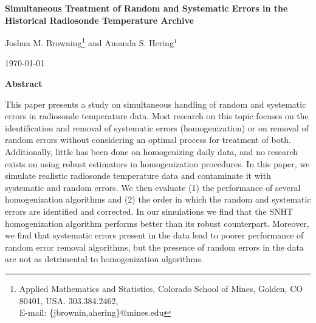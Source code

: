 \documentclass[12pt]{article}
\def\ni{\noindent}
\begin{document}
\thispagestyle{empty}
\baselineskip=28pt
\vskip 5mm
\begin{center} {\Large{\bf   Simultaneous Treatment of Random and Systematic Errors in the Historical Radiosonde Temperature Archive}}
\end{center}



\baselineskip=12pt
\vskip 5mm

\begin{center}\large
Joshua M. Browning\footnote{ \baselineskip=10pt
Applied Mathematics and Statistics, Colorado School of Mines, Golden, CO 80401,
USA. 303.384.2462, \\E-mail: \{jbrownin,ahering\}@mines.edu} and Amanda S. Hering$^1$


\end{center}

\baselineskip=17pt
\vskip 5mm
\centerline{\today}
\vskip 5mm

\begin{center}
{\large{\bf Abstract}}
\end{center}

\baselineskip=14pt

\ni  This paper presents a study on simultaneous handling of random and systematic errors in radiosonde temperature data.  Most research on this topic focuses on the identification and removal of systematic errors (homogenization) or on removal of random errors without considering an optimal process for treatment of both.  Additionally, little has been done on homogenizing daily data, and no research exists on using robust estimators in homogenization procedures.  In this paper, we simulate realistic radiosonde temperature data and contaminate it with systematic and random errors.  We then evaluate (1) the performance of several homogenization algorithms and (2) the order in which the random and systematic errors are identified and corrected.  In our simulations we find that the SNHT homogenization algorithm performs better than its robust counterpart.  Moreover, we find that systematic errors present in the data lead to poorer performance of random error removal algorithms, but the presence of random errors in the data are not as detrimental to homogenization algorithms.
\end{document}
